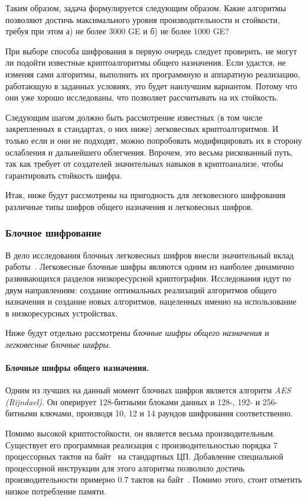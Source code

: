 Таким образом, задача формулируется следующим образом. Какие алгоритмы позволяют достичь максимального уровня производительности и стойкости, требуя при этом а) не более 3000 GE и б) не более 1000 GE?

При выборе способа шифрования в первую очередь следует проверить, не могут ли подойти известные криптоалгоритмы общего назначения. Если удастся, не изменяя сами алгоритмы, выполнить их программную и аппаратную реализацию, работающую в заданных условиях, это будет наилучшим вариантом. Потому что они уже хорошо исследованы, что позволяет рассчитывать на их стойкость.

Следующим шагом должно быть рассмотрение известных (в том числе закрепленных в стандартах, о них ниже) легковесных криптоалгоритмов. И только если и они не подходят, можно попробовать модифицировать их в сторону ослабления и дальнейшего облегчения. Впрочем, это весьма рискованный путь, так как требует от создателей значительных навыков в криптоанализе, чтобы гарантировать стойкость шифра.

Итак, ниже будут рассмотрены на пригодность для легковесного шифрования различные типы шифров общего назначения и легковесных шифров.

\subsubsection{Блочное шифрование}

В дело исследования блочных легковесных шифров внесли значительный вклад работы~\cite{src30,src27}. Легковесные блочные шифры являются одним из наиболее динамично развивающихся разделов низкоресурсной криптографии. Исследования идут по двум направлениям: создание оптимальных реализаций алгоритмов общего назначения и создание новых алгоритмов, нацеленных именно на использование в низкоресурсных устройствах.

Ниже будут отдельно рассмотрены \textit{блочные шифры общего назначения} и \textit{легковесные блочные шифры}.

\paragraph{Блочные шифры общего назначения.} Одним из лучших на данный момент блочных шифров является алгоритм \textit{AES (Rijndael)}. Он оперирует 128-битными блоками данных и 128-, 192- и 256-битными ключами, производя 10, 12 и 14 раундов шифрования соответственно.

Помимо высокой криптостойкости, он является весьма производительным. Существует его программная реализация с производительностью порядка 7 процессорных тактов на байт~\cite{src31} на стандартных ЦП. Добавление специальной процессорной инструкции для этого алгоритма позволило достичь производительности примерно 0.7 тактов на байт~\cite{src32}.  Помимо этого, стоит отметить низкое потребление памяти.

